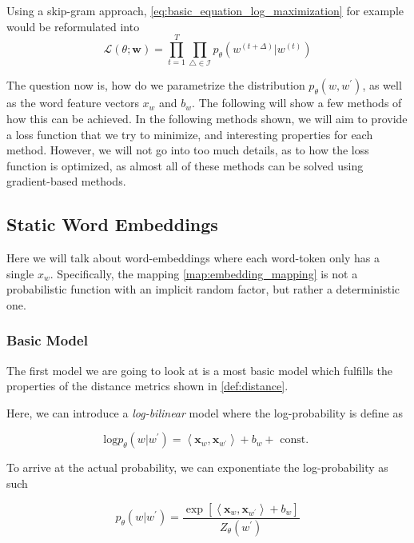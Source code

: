 \documentclass[a4paper,12pt,twoside,openright]{report}
\begin{document}
Using a skip-gram approach, \eqref{eq:basic_equation_log_maximization} for example would be reformulated into 
\begin{equation}
\mathcal{L}(\theta ; \mathbf{w})=\prod_{t=1}^{T} \prod_{\triangle \in \mathcal{I}} p_{\theta}\left(w^{(t +\Delta)} | w^{(t)}\right)
\end{equation}{\label{eq:basic_equation_log_maximization_skipgram}}


The question now is, how do we parametrize the distribution $p_\theta(w, w^{\prime})$, as well as the word feature vectors $x_w$ and $b_w$. 
The following will show a few methods of how this can be achieved.
In the following methods shown, we will aim to provide a loss function that we try to minimize, and interesting properties for each method.
However, we will not go into too much details, as to how the loss function is optimized, as almost all of these methods can be solved using gradient-based methods.

\newpage
\subsection{Static Word Embeddings}

Here we will talk about word-embeddings where each word-token only has a single $x_w$. 
Specifically, the mapping \eqref{map:embedding_mapping} is not a probabilistic function with an implicit random factor, but rather a deterministic one.

\subsubsection{Basic Model}

The first model we are going to look at is a most basic model which fulfills the properties of the distance metrics shown in \eqref{def:distance}.

Here, we can introduce a \textit{log-bilinear} model where the log-probability is define as

\begin{equation}
\text{log} p_{\theta}(w | w^{\prime}) = \left\langle\mathbf{x}_{w}, \mathbf{x}_{w^{\prime}}\right\rangle+b_{w} + \text { const. }
\end{equation}

To arrive at the actual probability, we can exponentiate the log-probability as such

$$
p_{\theta}\left(w | w^{\prime}\right)=\frac{\exp \left[\left\langle\mathbf{x}_{w}, \mathbf{x}_{w^{\prime}}\right\rangle+b_{w}\right]}{Z_{\theta}\left(w^{\prime}\right)}
$$
\end{document}

